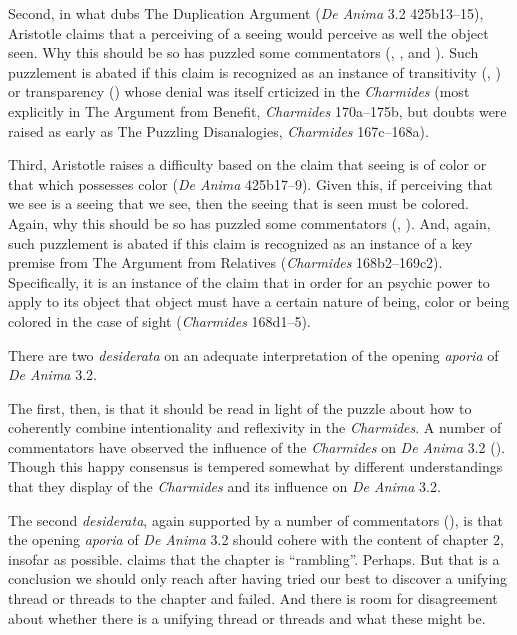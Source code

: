 Second, in what \citet{caston02} dubs The Duplication Argument (\emph{De Anima} 3.2 425b13–15), Aristotle claims that a perceiving of a seeing would perceive as well the object seen. Why this should be so has puzzled some commentators (\citealt[435]{Hicks:1907uq}, \citealt[121–2]{Hamlyn:2002ys}, and \citealt[44–5]{Kosman:2014ab}). Such puzzlement is abated if this claim is recognized as an instance of transitivity (\citealt{McCabe:2007ss}, \citealt{McCabe:2007jb}) or transparency (\citealt{Tsouna:2022aa}) whose denial was itself crticized in the \emph{Charmides} (most explicitly in The Argument from Benefit, \emph{Charmides} 170a–175b, but doubts were raised as early as The Puzzling Disanalogies, \emph{Charmides} 167c–168a).

Third, Aristotle raises a difficulty based on the claim that seeing is of color or that which possesses color (\emph{De Anima} 425b17–9). Given this, if perceiving that we see is a seeing that we see, then the seeing that is seen must be colored. Again, why this should be so has puzzled some commentators (\citealt[122]{Hamlyn:2002ys}, \citealt[45–6]{Kosman:2014ab}). And, again, such puzzlement is abated if this claim is recognized as an instance of a key premise from The Argument from Relatives (\emph{Charmides} 168b2–169c2). Specifically, it is an instance of the claim that in order for an psychic power to apply to its object that object must have a certain nature of being, color or being colored in the case of sight (\emph{Charmides} 168d1–5).

There are two \emph{desiderata} on an adequate interpretation of the opening \emph{aporia} of \emph{De Anima} 3.2. 

The first, then, is that it should be read in light of the puzzle about how to coherently combine intentionality and reflexivity in the \emph{Charmides}. A number of commentators have observed the influence of the \emph{Charmides} on \emph{De Anima} 3.2 (). Though this happy consensus is tempered somewhat by different understandings that they display of the \emph{Charmides} and its influence on \emph{De Anima} 3.2. 

The second \emph{desiderata}, again supported by a number of commentators (), is that the opening \emph{aporia} of \emph{De Anima} 3.2 should cohere with the content of chapter 2, insofar as possible. \citet[121]{Hamlyn:2002ys} claims that the chapter is ``rambling''. Perhaps. But that is a conclusion we should only reach after having tried our best to discover a unifying thread or threads to the chapter and failed. And there is room for disagreement about whether there is a unifying thread or threads and what these might be.

